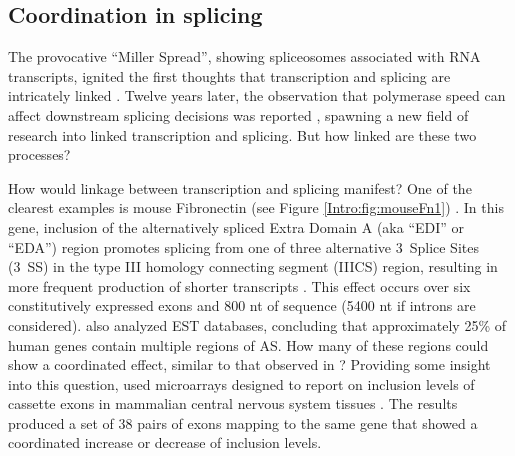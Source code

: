  \subsection{Coordination in splicing}\label{Intro:subsec:Coordination in splicing}

    The provocative ``Miller Spread'', showing spliceosomes associated with RNA transcripts, ignited the first thoughts that transcription and splicing are intricately linked \citep{Osheim1985}. Twelve years later, the observation that polymerase speed can affect downstream splicing decisions was reported \citep{Cramer1997}, spawning a new field of research into linked transcription and splicing. But how linked are these two processes? 

    How would linkage between transcription and splicing manifest? One of the clearest examples is mouse Fibronectin \fn{} (see Figure \ref{Intro:fig:mouseFn1}) \citep{Schwarzbauer1983, White2011a}. In this gene, inclusion of the alternatively spliced Extra Domain A (aka ``EDI'' or ``EDA'') region promotes splicing from one of three alternative 3\textprime~Splice Sites (3\textprime~SS) in the type III homology connecting segment (IIICS) region, resulting in more frequent production of shorter transcripts \citep{Fededa2005}. This effect occurs over six constitutively expressed exons and 800 nt of sequence (5400 nt if introns are considered). \citep{Fededa2005} also analyzed EST databases, concluding that approximately 25\% of human genes contain multiple regions of AS. How many of these regions could show a coordinated effect, similar to that observed in \fn{}? Providing some insight into this question, \citep{Fagnani2007} used microarrays designed to report on inclusion levels of cassette exons in mammalian central nervous system tissues \citep{Fagnani2007}. The results produced a set of 38 pairs of exons mapping to the same gene that showed a coordinated increase or decrease of inclusion levels. 

